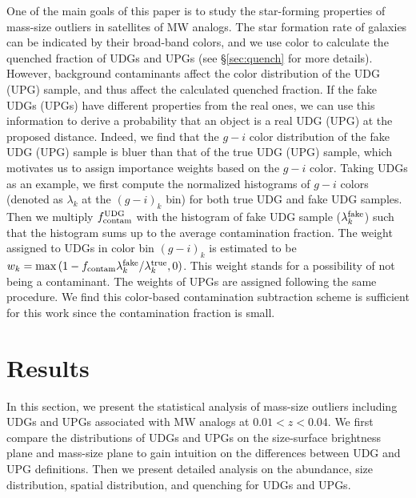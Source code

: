 \documentclass[twocolumn,astrosymb,twocolappendix]{aastex631}
\begin{document}
\begin{CJK*}{UTF8}{gbsn}
One of the main goals of this paper is to study the star-forming properties of mass-size outliers in satellites of MW analogs. The star formation rate of galaxies can be indicated by their broad-band colors, and we use color to calculate the quenched fraction of UDGs and UPGs (see \S \ref{sec:quench} for more details). However, background contaminants affect the color distribution of the UDG (UPG) sample, and thus affect the calculated quenched fraction. If the fake UDGs (UPGs) have different properties from the real ones, we can use this information to derive a probability that an object is a real UDG (UPG) at the proposed distance. %
Indeed, we find that the $g-i$ color distribution of the fake UDG (UPG) sample is bluer than that of the true UDG (UPG) sample, which motivates us to assign importance weights based on the $g-i$ color. Taking UDGs as an example, we first compute the normalized histograms of $g-i$ colors (denoted as $\lambda_k$ at the $(g-i)_{k}$ bin) for both true UDG and fake UDG samples. Then we multiply $f_{\rm contam}^{\rm UDG}$ with the histogram of fake UDG sample ($\lambda_k^{\rm fake}$) such that the histogram sums up to the average contamination fraction. The weight assigned to UDGs in color bin $(g-i)_k$ is estimated to be $w_k = \max\,(1 - f_{\rm contam} \lambda_k^{\rm fake} / \lambda_k^{\rm true}, 0)$. This weight stands for a possibility of not being a contaminant. The weights of UPGs are assigned following the same procedure. We find this color-based contamination subtraction scheme is sufficient for this work since the contamination fraction is small. %


\section{Results}\label{sec:results}
In this section, we present the statistical analysis of mass-size outliers including UDGs and UPGs associated with MW analogs at $0.01 < z < 0.04$. We first compare the distributions of UDGs and UPGs on the size-surface brightness plane and mass-size plane to gain intuition on the differences between UDG and UPG definitions. Then we present detailed analysis on the abundance, size distribution, spatial distribution, and quenching for UDGs and UPGs. 


\end{CJK*}
\end{document}
